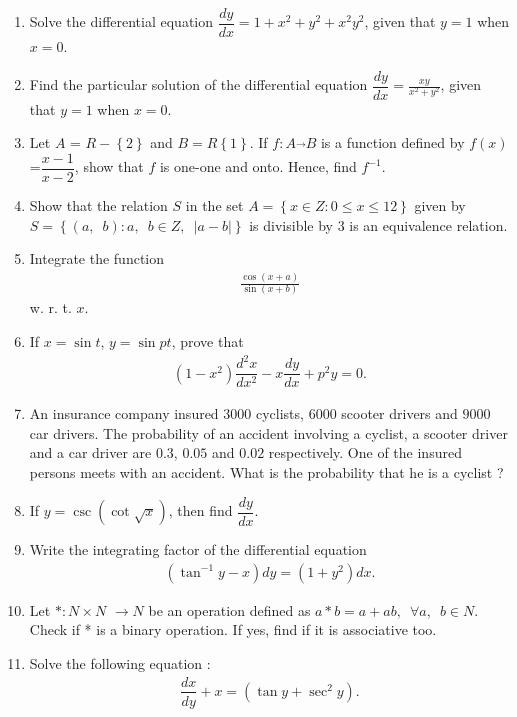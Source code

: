 \documentclass[12pt,-letter paper]{article}
\providecommand{\cbrak}[1]{\ensuremath{\left\{#1\right\}}}
\providecommand{\brak}[1]{\ensuremath{\left(#1\right)}}
\providecommand{\abs}[1]{\left\vert#1\right\vert}
\begin{document}
\begin{enumerate}
    \item Solve the differential equation $\dfrac{dy}{dx}=1+x^{2}+y^{2}+x^{2}y^{2}$, given that $ y = 1 $ when $x = 0$.

    \item Find the particular solution of the differential equation $\dfrac{dy}{dx}=\frac{xy}{x^2+y^2}$, given that $y=1$ when $x=0$.
    
    \item Let $A$ = $R-\cbrak{2}$ and $B=R\cbrak{1}$. If $f: A\overrightarrow{}  B$ is a function defined by $f\brak{x}$=$\dfrac{x-1}{x-2}$, show that $f$ is one-one and onto. Hence, find $f^{-1}$.

    \item Show that the relation $S$ in the set $A = \cbrak{x \in Z : 0 \leq x \leq 12}$ given by $S = \cbrak{(a,\hspace{6pt}b) : a,\hspace{6pt}b \in Z,\hspace{6pt}\abs{a-b}}$ is divisible by $3$ is an equivalence relation.

    \item Integrate the function
    \begin{align*}
    \frac{\cos{\brak{x+a}}}{\sin{\brak{x+b}}}
    \end{align*}
    w. r. t. $x$.

    \item If $x = \sin{t}$, $y = \sin{pt}$, prove that
    \begin{align*}
    \brak{1-x^{2}}\dfrac{d^{2}x}{dx^{2}}-x\dfrac{dy}{dx}+p^{2}y=0.
    \end{align*}

    \item An insurance company insured $3000$ cyclists,  $6000$ scooter drivers and $9000$ car drivers. The probability of an accident involving a cyclist, a scooter driver and a car driver are $0.3$, $0.05$ and $0.02$ respectively. One of the insured persons meets with an accident. What is the probability that he is a cyclist ?

    \item If $y=\csc{\brak{\cot{\sqrt{x}}}}$, then find $\dfrac{dy}{dx}$.

    \item Write the integrating factor of the differential equation
    \begin{align*}
    \brak{\tan^{-1}{y-x}}dy=\brak{1+y^{2}}dx.
    \end{align*}

    \item Let $* : N \times N$ $\rightarrow N $ be an operation defined as $a * b = a + ab, \hspace{6pt}\forall a,\hspace{6pt}b \in N $. Check if * is a binary operation. If yes, find if it is associative too.

    \item Solve the following  equation :
     \begin{align*}
         \dfrac{dx}{dy}+x=\brak{\tan{y}+\sec^{2}{y}}.
     \end{align*}
    
\end{enumerate}
\end{document}
